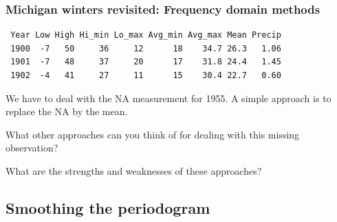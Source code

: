 \begin{frame}[fragile]

\frametitle{Michigan winters revisited: Frequency domain methods}



\begin{knitrout}\small
{}\color{fgcolor}\begin{kframe}
\begin{alltt}
 \hlkwb{<-} \hldef{(}\hldef{=}\hldef{,}\hldef{=}\hldef{)}
\hldef{(y[,}\hlopt{:}\hldef{],}\hldef{)}
\end{alltt}
\begin{verbatim}
 Year Low High Hi_min Lo_max Avg_min Avg_max Mean Precip
 1900  -7   50     36     12      18    34.7 26.3   1.06
 1901  -7   48     37     20      17    31.8 24.4   1.45
 1902  -4   41     27     11      15    30.4 22.7   0.60
\end{verbatim}
\end{kframe}
\end{knitrout}

\bi

\item  We have to deal with the NA measurement for 1955. A simple approach is to replace the NA by the mean.

\item  What other approaches can you think of for dealing with this missing observation?

\item What are the strengths and weaknesses of these approaches?

\ei

\begin{knitrout}\small
{}\color{fgcolor}\begin{kframe}
\begin{alltt}
 \hlkwb{<-} \hlopt{$}
\hldef{low[}\hldef{(low)]} \hlkwb{<-}  \hldef{=}\hldef{)}
\end{alltt}
\end{kframe}
\end{knitrout}

\end{frame}

\subsection{Smoothing the periodogram}

